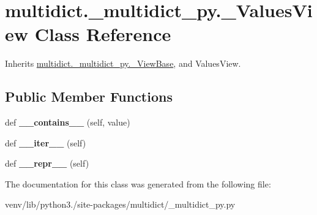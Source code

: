 \hypertarget{classmultidict_1_1__multidict__py_1_1___values_view}{}\section{multidict.\+\_\+multidict\+\_\+py.\+\_\+\+Values\+View Class Reference}
\label{classmultidict_1_1__multidict__py_1_1___values_view}


Inherits \hyperlink{classmultidict_1_1__multidict__py_1_1___view_base}{multidict.\+\_\+multidict\+\_\+py.\+\_\+\+View\+Base}, and Values\+View.

\subsection*{Public Member Functions}
\begin{DoxyCompactItemize}
\item 
\mbox{\label{classmultidict_1_1__multidict__py_1_1___values_view_a93630c6b5114b430e4d17883e20e4146}} 
def {\bfseries \+\_\+\+\_\+contains\+\_\+\+\_\+} (self, value)
\item 
\mbox{\label{classmultidict_1_1__multidict__py_1_1___values_view_a8f304d6febc3e2ed1fc0d6c7710ba25d}} 
def {\bfseries \+\_\+\+\_\+iter\+\_\+\+\_\+} (self)
\item 
\mbox{\label{classmultidict_1_1__multidict__py_1_1___values_view_abb83104018e7e93b8a734dbb85936553}} 
def {\bfseries \+\_\+\+\_\+repr\+\_\+\+\_\+} (self)
\end{DoxyCompactItemize}


The documentation for this class was generated from the following file\+:\begin{DoxyCompactItemize}
\item 
venv/lib/python3./site-\/packages/multidict/\+\_\+multidict\+\_\+py.\+py\end{DoxyCompactItemize}
